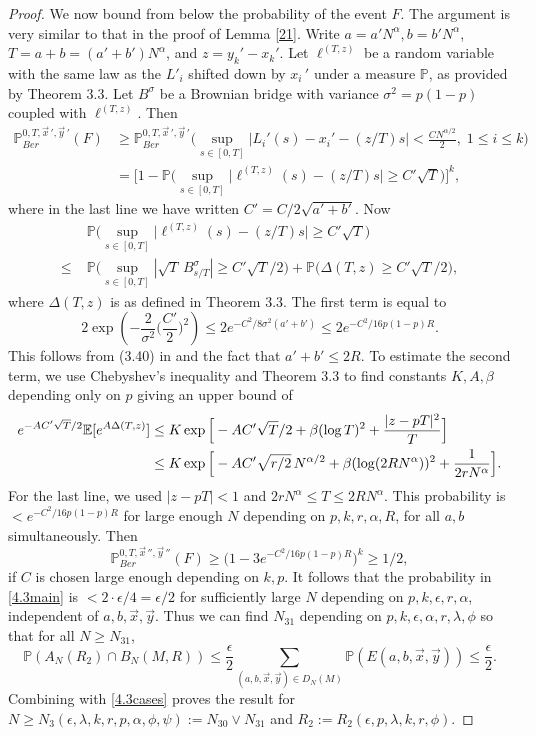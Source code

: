 \begin{proof}
		We now bound from below the probability of the event $F$. The argument is very similar to that in the proof of Lemma \ref{21}. Write $a = a'N^\alpha, b = b'N^\alpha$, $T = a+b = (a'+b')N^\alpha$, and $z = y_k' - x_k'$. Let $\ell^{(T,z)}$ be a random variable with the same law as the $L'_i$ shifted down by $x_i\,'$ under a measure $\mathbb{P}$, as provided by Theorem 3.3. Let $B^{\sigma}$ be a Brownian bridge with variance $\sigma^2 = p(1-p)$ coupled with $\ell^{(T,z)}$. Then
		\begin{align*}
		\mathbb{P}^{0,T,\vec{x}\,', \vec{y}\,'}_{Ber}(F) &\geq \mathbb{P}^{0,T,\vec{x}\,', \vec{y}\,'}_{Ber} \Big( \sup_{s\in[0,T]} \Big|L_i'(s) - x_i' - (z/T)s\Big| < \frac{CN^{\alpha/2}}{2},\; 1\leq i\leq k \Big)\\
		&= \Big[ 1 - \mathbb{P} \Big( \sup_{s\in[0,T]} \Big|\ell^{(T,z)}(s) - (z/T)s\Big| \geq C'\sqrt{T} \Big) \Big]^k,
		\end{align*}
		where in the last line we have written $C' = C/2\sqrt{a'+b'}$. Now
		\begin{align*}
		&\mathbb{P} \Big( \sup_{s\in[0,T]} \Big|\ell^{(T,z)}(s) - (z/T)s\Big| \geq C'\sqrt{T} \Big)\\
		\leq \; & \mathbb{P} \Big( \sup_{s\in[0,T]} |\sqrt{T}\,B^{\sigma}_{s/T}| \geq C'\sqrt{T}/2\Big) + \mathbb{P} \Big( \Delta(T,z) \geq C'\sqrt{T}/2 \Big),
		\end{align*}
		where $\Delta(T,z)$ is as defined in Theorem 3.3. The first term is equal to
		\[
		2\exp\left( - \frac{2}{\sigma^2}\Big(\frac{C'}{2}\Big)^2\right) \leq 2e^{-C^2/8\sigma^2(a'+b')} \leq 2e^{-C^2/16p(1-p)R}.
		\]
		This follows from (3.40) in \cite[Chapter 4]{KS} and the fact that $a'+b'\leq 2R$. To estimate the second term, we use Chebyshev's inequality and Theorem 3.3 to find constants $K,A,\beta$ depending only on $p$ giving an upper bound of
		\begin{align*}
		e^{-AC'\sqrt{T}/2}\mathbb{E}[e^{A\Delta(T,z)}] &\leq K\exp\Big[-AC'\sqrt{T}/2 + \beta(\log T)^2 + \frac{|z-pT|^2}{T}\Big]\\
		&\leq K\exp\Big[ -AC'\sqrt{r/2}\,N^{\alpha/2} + \beta(\log (2RN^\alpha))^2 + \frac{1}{2rN^{\alpha}}\Big].
		\end{align*}
		For the last line, we used $|z-pT| < 1$ and $2rN^\alpha \leq T \leq 2RN^\alpha$. This probability is $< e^{-C^2/16p(1-p)R}$ for large enough $N$ depending on $p,k,r,\alpha,R$, for all $a,b$ simultaneously. Then
		\[
		\mathbb{P}^{0,T,\vec{x}\,'',\vec{y}\,''}_{Ber}(F) \geq \big(1 - 3e^{-C^2/16p(1-p)R}\big)^k \geq 1/2,
		\]
		if $C$ is chosen large enough depending on $k,p$.	It follows that the probability in \eqref{4.3main} is $< 2\cdot \epsilon/4 = \epsilon/2$ for sufficiently large $N$ depending on $p,k,\epsilon,r,\alpha$, independent of $a,b,\vec{x},\vec{y}$. Thus we can find $N_{31}$ depending on $p,k,\epsilon,\alpha,r,\lambda,\phi$ so that for all $N\geq N_{31}$,
		\[
		\mathbb{P}(A_N(R_2)\cap B_N(M,R)) \leq \frac{\epsilon}{2}\sum_{(a,b,\vec{x},\vec{y})\in D_N(M)} \mathbb{P}(E(a,b,\vec{x},\vec{y})) \leq \frac{\epsilon}{2}.
		\]
		Combining with \eqref{4.3cases} proves the result for $N\geq N_3(\epsilon,\lambda,k,r,p,\alpha,\phi,\psi) := N_{30} \vee N_{31}$ and $R_2 := R_2(\epsilon,p,\lambda,k,r,\phi)$.
		

\end{proof}
